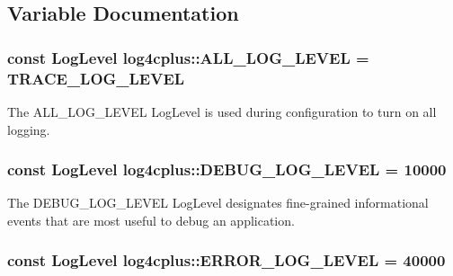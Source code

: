\subsection{Variable Documentation}
\hypertarget{namespacelog4cplus_adffab3d436930cb99d3dc713f428b96c}{
\subsubsection[{A\-L\-L\-\_\-\-L\-O\-G\-\_\-\-L\-E\-V\-E\-L}]{\setlength{\rightskip}{0pt plus 5cm}const {\bf Log\-Level} log4cplus\-::\-A\-L\-L\-\_\-\-L\-O\-G\-\_\-\-L\-E\-V\-E\-L = {\bf T\-R\-A\-C\-E\-\_\-\-L\-O\-G\-\_\-\-L\-E\-V\-E\-L}}}\label{namespacelog4cplus_adffab3d436930cb99d3dc713f428b96c}
The {\ttfamily A\-L\-L\-\_\-\-L\-O\-G\-\_\-\-L\-E\-V\-E\-L} Log\-Level is used during configuration to turn on all logging. \hypertarget{namespacelog4cplus_a9d74faee54b25eca5298aa2f0add28d7}{
\subsubsection[{D\-E\-B\-U\-G\-\_\-\-L\-O\-G\-\_\-\-L\-E\-V\-E\-L}]{\setlength{\rightskip}{0pt plus 5cm}const {\bf Log\-Level} log4cplus\-::\-D\-E\-B\-U\-G\-\_\-\-L\-O\-G\-\_\-\-L\-E\-V\-E\-L = 10000}}\label{namespacelog4cplus_a9d74faee54b25eca5298aa2f0add28d7}
The {\ttfamily D\-E\-B\-U\-G\-\_\-\-L\-O\-G\-\_\-\-L\-E\-V\-E\-L} Log\-Level designates fine-\/grained informational events that are most useful to debug an application. \hypertarget{namespacelog4cplus_a4828581892f170bb319d5719f88178f3}{
\subsubsection[{E\-R\-R\-O\-R\-\_\-\-L\-O\-G\-\_\-\-L\-E\-V\-E\-L}]{\setlength{\rightskip}{0pt plus 5cm}const {\bf Log\-Level} log4cplus\-::\-E\-R\-R\-O\-R\-\_\-\-L\-O\-G\-\_\-\-L\-E\-V\-E\-L = 40000}}\label{namespacelog4cplus_a4828581892f170bb319d5719f88178f3}
